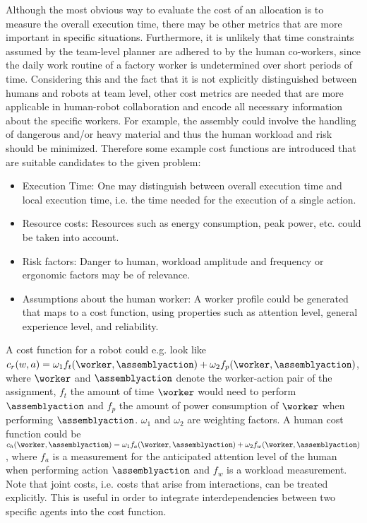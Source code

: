 Although the most obvious way to evaluate the cost of an allocation is to measure the overall execution time, there may be other metrics that are more important in specific situations.
Furthermore, it is unlikely that time constraints assumed by the team-level planner are adhered to by the human co-workers, since the daily work routine of a factory worker is undetermined over short periods of time.
Considering this and the fact that it is not explicitly distinguished between humans and robots at team level, other cost metrics are needed that are more applicable in human-robot collaboration and encode all necessary information about the specific workers.
For example, the assembly could involve the handling of dangerous and/or heavy material and thus the human workload and risk should be minimized.
Therefore some example cost functions are introduced that are suitable candidates to the given problem:
\begin{itemize}
\item Execution Time: One may distinguish between overall execution time and local execution time, i.e. the time needed for the execution of a single action.
\item Resource costs: Resources such as energy consumption, peak power, etc. could be taken into account.
\item Risk factors: Danger to human, workload amplitude and frequency or ergonomic factors may be of relevance.
\item Assumptions about the human worker: A worker profile could be generated that maps to a cost function, using properties such as attention level, general experience level, and reliability.
\end{itemize}

A cost function for a robot could e.g. look like $c_r(w,a)=\omega_1 f_t(\worker,\assemblyaction)+\omega_2 f_p(\worker,\assemblyaction)$, where $\worker$ and $\assemblyaction$ denote the worker-action pair of the assignment, $f_t$ the amount of time $\worker$ would need to perform $\assemblyaction$ and $f_p$ the amount of power consumption of $\worker$ when performing $\assemblyaction$.
$\omega_1$ and $\omega_2$ are weighting factors.
A human cost function could be $c_h(\worker,\assemblyaction)=\omega_1 f_a(\worker,\assemblyaction)+\omega_2 f_w(\worker,\assemblyaction)$, where $f_a$ is a measurement for the anticipated attention level of the human when performing action $\assemblyaction$ and $f_w$ is a workload measurement.
Note that joint costs, i.e. costs that arise from interactions, can be treated explicitly.
This is useful in order to integrate interdependencies between two specific agents into the cost function.

